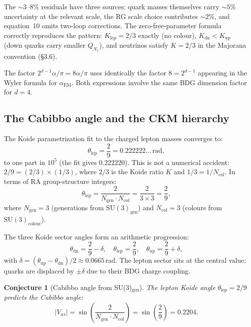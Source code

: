 \documentclass[11pt]{article}
\newtheorem{conjecture}{Conjecture}
\begin{document}
The $\sim 3$--$8\%$ residuals have three sources: quark masses themselves carry $\sim 5\%$ uncertainty at the relevant scale, the RG scale choice contributes $\sim 2\%$, and equation~10 omits two-loop corrections. The zero-free-parameter formula correctly reproduces the pattern: $K_{\mathrm{lep}}=2/3$ exactly (no colour), $K_{\mathrm{dn}}<K_{\mathrm{up}}$ (down quarks carry smaller $Q_{N_1}$), and neutrinos satisfy $K=2/3$ in the Majorana convention (\S3.6).

The factor $2^{d-1}\alpha/\pi=8\alpha/\pi$ uses identically the factor $8=2^{d-1}$ appearing in the Wyler formula for $\alpha_{\mathrm{EM}}$. Both expressions involve the same BDG dimension factor for $d=4$.

\subsection{The Cabibbo angle and the CKM hierarchy}
\label{sec:ckm}

The Koide parametrization fit to the charged lepton masses converges to:
\begin{equation}
\theta_{\mathrm{lep}} = \frac{2}{9} = 0.222222\ldots\,\mathrm{rad},
\end{equation}
to one part in $10^5$ (the fit gives $0.222220$). This is not a numerical accident: $2/9=(2/3)\times(1/3)$, where $2/3$ is the Koide ratio $K$ and $1/3=1/N_{\mathrm{col}}$. In terms of RA group-structure integers:
\begin{equation}
\theta_{\mathrm{lep}} = \frac{2}{N_{\mathrm{gen}}\cdot N_{\mathrm{col}}} = \frac{2}{3\times 3} = \frac{2}{9},
\end{equation}
where $N_{\mathrm{gen}}=3$ (generations from $\mathrm{SU}(3)_{\mathrm{gen}}$) and $N_{\mathrm{col}}=3$ (colours from $\mathrm{SU}(3)_{\mathrm{colour}}$).

The three Koide sector angles form an arithmetic progression:
\begin{equation}
\theta_{\mathrm{dn}} = \frac{2}{9}-\delta,\quad \theta_{\mathrm{lep}}=\frac{2}{9},\quad \theta_{\mathrm{up}}=\frac{2}{9}+\delta,
\end{equation}
with $\delta=(\theta_{\mathrm{up}}-\theta_{\mathrm{dn}})/2\approx 0.0665$\,rad. The lepton sector sits at the central value; quarks are displaced by $\pm\delta$ due to their BDG charge coupling.

\begin{conjecture}[Cabibbo angle from SU(3)$_{\mathrm{gen}}$]
\label{conj:cabibbo}
The lepton Koide angle $\theta_{\mathrm{lep}}=2/9$ predicts the Cabibbo angle:
\begin{equation}
|V_{us}| = \sin\!\left(\frac{2}{N_{\mathrm{gen}}\cdot N_{\mathrm{col}}}\right) = \sin\!\left(\frac{2}{9}\right) = 0.2204.
\end{equation}
\end{conjecture}
\end{document}
